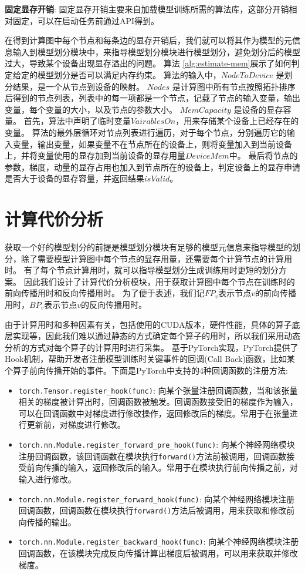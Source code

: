 \textbf{固定显存开销}: 固定显存开销主要来自加载模型训练所需的算法库，这部分开销相对固定，可以在启动任务前通过API得到。

在得到计算图中每个节点和每条边的显存开销后，我们就可以将其作为模型的元信息输入到模型划分模块中，来指导模型划分模块进行模型划分，避免划分后的模型过大，导致某个设备出现显存溢出的问题。
算法 \ref{alg:estimate-mem}展示了如何判定给定的模型划分是否可以满足内存约束。
算法的输入中，$\mathit{NodeToDevice}$ 是划分结果，是一个从节点到设备的映射。
$\mathit{Nodes}$ 是计算图中所有节点按照拓扑排序后得到的节点列表，列表中的每一项都是一个节点，记载了节点的输入变量，输出变量，每个变量的大小，以及节点的参数大小。
$\mathit{MemCapacity}$ 是设备的显存容量。
首先，算法中声明了临时变量$\mathit{VairablesOn}$，用来存储某个设备上已经存在的变量。
算法的最外层循环对节点列表进行遍历，对于每个节点，分别遍历它的输入变量，输出变量，如果变量不在节点所在的设备上，则将变量加入到当前设备上，并将变量使用的显存加到当前设备的显存用量$\mathit{DeviceMem}$中。
最后将节点的参数，梯度，动量的显存占用也加入到节点所在的设备上，判定设备上的显存申请是否大于设备的显存容量，并返回结果$\mathit{isValid}$。



\section{计算代价分析}
\label{sec:time}
获取一个好的模型划分的前提是模型划分模块有足够的模型元信息来指导模型的划分，除了需要模型计算图中每个节点的显存用量，还需要每个计算节点的计算用时。
有了每个节点计算用时，就可以指导模型划分生成训练用时更短的划分方案。
因此我们设计了计算代价分析模块，用于获取计算图中每个节点在训练时的前向传播用时和反向传播用时。
为了便于表述，我们记$FP_{v}$表示节点$v$的前向传播用时，$BP_{v}$表示节点$v$的反向传播用时。

由于计算用时和多种因素有关，包括使用的CUDA版本，硬件性能，具体的算子底层实现等，因此我们难以通过静态的方式确定每个算子的用时，所以我们采用动态分析的方式对每个算子的计算用时进行采集。
\sys{}基于PyTorch实现，PyTorch提供了Hook机制，帮助开发者注册模型训练时关键事件的回调(Call Back)函数，比如某个算子前向传播开始的事件。下面是PyTorch中支持的4种回调函数的注册方法:
\begin{itemize}
	\item \texttt{torch.Tensor.register\_hook(func)}: 向某个张量注册回调函数，当和该张量相关的梯度被计算出时，回调函数被触发。回调函数接受旧的梯度作为输入，可以在回调函数中对梯度进行修改操作，返回修改后的梯度。常用于在张量进行更新前，对梯度进行修改。
	\item \texttt{torch.nn.Module.register\_forward\_pre\_hook(func)}: 向某个神经网络模块注册回调函数，该回调函数在模块执行\texttt{forward()}方法前被调用，回调函数接受前向传播的输入，返回修改后的输入。常用于在模块执行前向传播之前，对输入进行修改。
	\item \texttt{torch.nn.Module.register\_forward\_hook(func)}: 向某个神经网络模块注册回调函数，回调函数在模块执行\texttt{forward()}方法后被调用，用来获取和修改前向传播的输出。
	\item \texttt{torch.nn.Module.register\_backward\_hook(func)}: 向某个神经网络模块注册回调函数，在该模块完成反向传播计算出梯度后被调用，可以用来获取并修改梯度。
\end{itemize}

